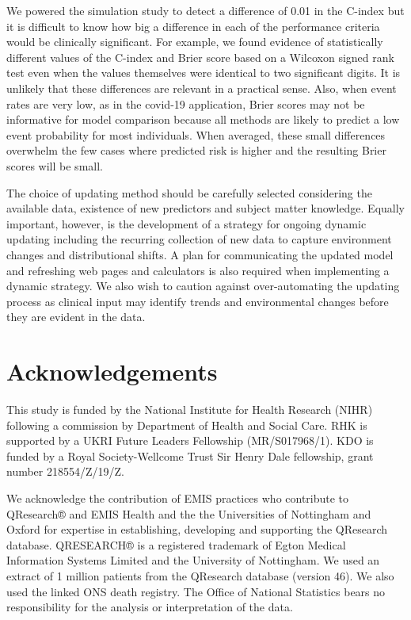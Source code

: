 \documentclass[]{article}
\begin{document}
We powered the simulation study to detect a difference of 0.01 in the C-index but it is difficult to know how big a difference in each of the performance criteria would be clinically significant. For example, we found evidence of statistically different values of the C-index and Brier score based on a Wilcoxon signed rank test even when the values themselves were identical to two significant digits. It is unlikely that these differences are relevant in a practical sense. Also, when event rates are very low, as in the covid-19 application, Brier scores may not be informative for model comparison because all methods are likely to predict a low event probability for most individuals. When averaged, these small differences overwhelm the few cases where predicted risk is higher and the resulting Brier scores will be small.

The choice of updating method should be carefully selected considering the available data, existence of new predictors and subject matter knowledge. Equally important, however, is the development of a strategy for ongoing dynamic updating including the recurring collection of new data to capture environment changes and distributional shifts. A plan for communicating the updated model and refreshing web pages and calculators is also required when implementing a dynamic strategy. We also wish to caution against over-automating the updating process as clinical input may identify trends and environmental changes before they are evident in the data.






\section{Acknowledgements}

This study is funded by the National Institute for Health Research (NIHR) following a commission by Department of Health and Social Care. RHK is supported by a UKRI Future Leaders Fellowship (MR/S017968/1). KDO is funded by a Royal Society-Wellcome Trust Sir Henry Dale fellowship, grant number  218554/Z/19/Z.

We acknowledge the contribution of EMIS practices who contribute to QResearch® and EMIS Health and the the Universities of Nottingham and Oxford for expertise in establishing, developing and supporting the QResearch database. QRESEARCH® is a registered trademark of Egton Medical Information Systems Limited and the University of Nottingham. We used an extract of 1 million patients from the QResearch database (version 46). We also used the linked ONS death registry. The Office of National Statistics bears no responsibility for the analysis or interpretation of the data.
\end{document}

